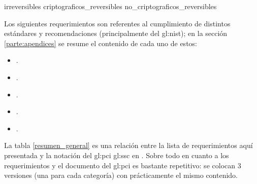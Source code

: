 {irreversibles}
{criptograficos_reversibles}
{no_criptograficos_reversibles}


Los siguientes requerimientos son referentes al cumplimiento
de distintos estándares y recomendaciones (principalmente del \gls{gl:nist});
en la sección \ref{parte:apendices} se resume el contenido de cada uno de
estos:

\begin{itemize}
  \item {}.
  \item {}.
  \item {}.
  \item {}.
  \item {}.
\end{itemize}

La tabla \ref{resumen_general} es una relación entre la lista de
requerimientos aquí presentada y la notación del \gls{gl:pci} \gls{gl:ssc} en
\cite{pci_tokens}. Sobre todo en cuanto a los requerimientos
 y
 el documento del \gls{gl:pci} es
bastante repetitivo: se colocan 3 versiones (una para cada categoría) con
prácticamente el mismo contenido.

